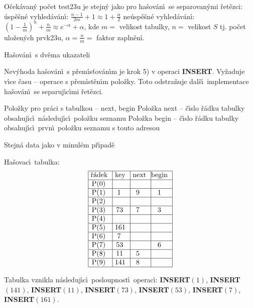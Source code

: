 \flushpar O\v cek\'avan\'y po\v cet test\accent23u je stejn\'y jako pro 
ha\v sov\'an\'\i\ se se\-pa\-ro\-va\-n\'y\-mi \v ret\v ezci:\newline 
\phantom{---}\'usp\v e\v sn\'e vyhled\'av\'an\'\i : $\frac {n-1}{2m}+1\approx 
1+\frac {\alpha}2$\newline 
\phantom{---}ne\'usp\v e\v sn\'e vyhled\'av\'an\'\i : $(1-\frac 1m)^n+\frac nm
\approx e^{-\alpha}+\alpha$,\newline 
kde $m=$ velikost tabulky, $n=$ velikost $S$ tj. po\v cet ulo\v zen\'ych 
prvk\accent23u, $\alpha =\frac nm=$ faktor zapln\v en\'\i.

\heading
Ha\v sov\'an\'\i\ s dv\v ema ukazateli
\endheading

\flushpar Nev\'yhoda ha\v sov\'an\'\i\ s p\v rem\'\i s\v tov\'an\'\i m je krok 5) v operaci 
{\bf INSERT}. Vy\v zaduje v\'\i ce \v casu -- operace s p\v rem\'\i st\v en\'\i m 
polo\v zky. Toto odstra\v nuje dal\v s\'\i\ implementace ha\v sov\'an\'\i\ se 
separuj\'\i c\'\i mi \v ret\v ezci.
\smallskip

\flushpar Polo\v zky pro pr\'aci s tabulkou -- next, 
begin\newline 
\phantom{---}Polo\v zka next -- \v c\'\i slo \v r\'adku tabulky obsahuj\'\i c\'\i\ 
n\'asleduj\'\i c\'\i\ polo\v z\-ku seznamu\newline 
\phantom{---}Polo\v zka begin -- \v c\'\i slo \v r\'adku tabulky obsahuj\'\i c\'\i\ prvn\'\i\ polo\v zku seznamu 
s touto adresou\newline 

\flushpar Stejn\'a data jako v minul\'em p\v r\'\i pad\v e\newline 

\flushpar Ha\v sovac\'\i\ tabulka:
$$\vtop{\offinterlineskip\halign {\strut\vrule\ # & \vrule\ # & \vrule\ # & \vrule \hfil # \hfil \vrule\cr\noalign{\hrule}\v r\'adek & key & next & begin \hfil \cr\noalign{\hrule}P(0) & & & \hfill \cr\noalign{\hrule}P(1) & 1 & 9 & 1 \cr\noalign{\hrule}P(2) & & & \hfill \cr\noalign{\hrule}P(3) & 73 & 7 & 3 \cr\noalign{\hrule}P(4) & & &\hfill \cr\noalign{\hrule}P(5) & 161 & & \hfill \cr\noalign{\hrule}P(6) & 7 & & \hfill \cr\noalign{\hrule}P(7) & 53 & & 6 \cr\noalign{\hrule}P(8) & 11 & 5 & \hfill \cr\noalign{\hrule}P(9) & 141 & 8 & \hfill \cr\noalign{\hrule}}}$$

\flushpar Tabulka vznikla n\'asleduj\'\i c\'\i\ posloupnost\'\i\ 
operac\'\i :\newline 
{\bf INSERT$(1)$}, {\bf INSERT$(141)$}, {\bf INSERT$(11)$}, {\bf INSERT$
(73)$}, 
{\bf INSERT$(53)$}, {\bf INSERT$(7)$}, {\bf INSERT$(161)$}. 
\medskip

